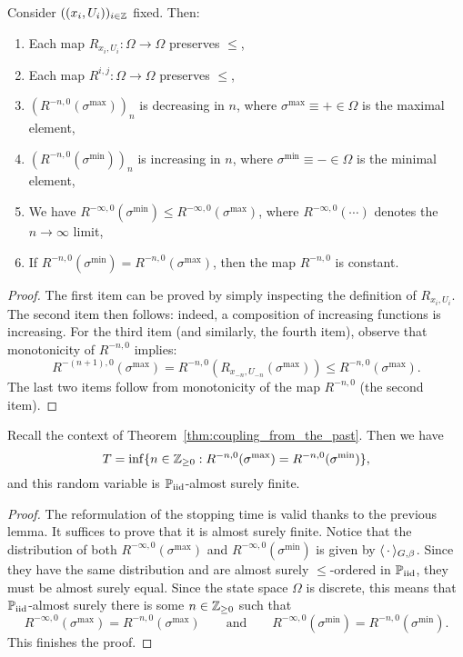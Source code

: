 \begin{lemma}
    Consider $((x_i,U_i))_{i\in\mathbb Z}$ fixed. Then:
    \begin{enumerate}
        \item Each map $R_{x_i,U_i}:\Omega\to\Omega$ preserves $\leq$,
        \item Each map $R^{i,j}:\Omega\to\Omega$ preserves $\leq$,
        \item $(R^{-n,0}(\sigma^{\max}))_n$ is decreasing in $n$, where $\sigma^{\max}\equiv+\in\Omega$ is the maximal element,
        \item $(R^{-n,0}(\sigma^{\min}))_n$ is increasing in $n$, where $\sigma^{\min}\equiv-\in\Omega$ is the minimal element,
        \item We have $R^{-\infty,0}(\sigma^{\min})\leq R^{-\infty,0}(\sigma^{\max})$,
        where $R^{-\infty,0}(\cdots)$ denotes the $n\to\infty$ limit,
        \item If  $R^{-n,0}(\sigma^{\min})= R^{-n,0}(\sigma^{\max})$, then the map $R^{-n,0}$ is constant.
    \end{enumerate}
\end{lemma}

\begin{proof}
    The first item can be proved by simply inspecting the definition of $R_{x_i,U_i}$.
    The second item then follows: indeed, a composition of increasing functions is increasing.
    For the third item (and similarly, the fourth item), observe that monotonicity of $R^{-n,0}$ implies:
    \[
        R^{-(n+1),0}(\sigma^{\max})
        =
        R^{-n,0}(R_{x_{-n},U_{-n}}(\sigma^{\max}))
        \leq
        R^{-n,0}(\sigma^{\max}).
    \]
    The last two items follow from monotonicity of the map $R^{-n,0}$ (the second item).
\end{proof}


\begin{lemma}
    Recall the context of Theorem~\ref{thm:coupling_from_the_past}.
    Then we have
    \[
        T=\inf\{n\in\mathbb Z_{\geq 0}:R^{-n,0}(\sigma^{\max})=R^{-n,0}(\sigma^{\min})\},
    \]
    and this random variable is $\mathbb P_{\operatorname{iid}}$-almost surely finite.
\end{lemma}

\begin{proof}
    The reformulation of the stopping time is valid thanks to the previous lemma.
    It suffices to prove that it is almost surely finite.
    Notice that the distribution of both $R^{-\infty,0}(\sigma^{\max})$ and $R^{-\infty,0}(\sigma^{\min})$
    is given by $\langle\,\cdot\,\rangle_{G,\beta}$.
    Since they have the same distribution and are almost surely $\leq$-ordered in $\mathbb P_{\operatorname{iid}}$,
    they must be almost surely equal.
    Since the state space $\Omega$ is discrete,
    this means that $\mathbb P_{\operatorname{iid}}$-almost surely
    there is some $n\in\mathbb Z_{\geq 0}$ such that
    \[
        R^{-\infty,0}(\sigma^{\max})=R^{-n,0}(\sigma^{\max})
        \qquad
        \text{and}
        \qquad
        R^{-\infty,0}(\sigma^{\min})=R^{-n,0}(\sigma^{\min}).
    \]
    This finishes the proof.
\end{proof}
